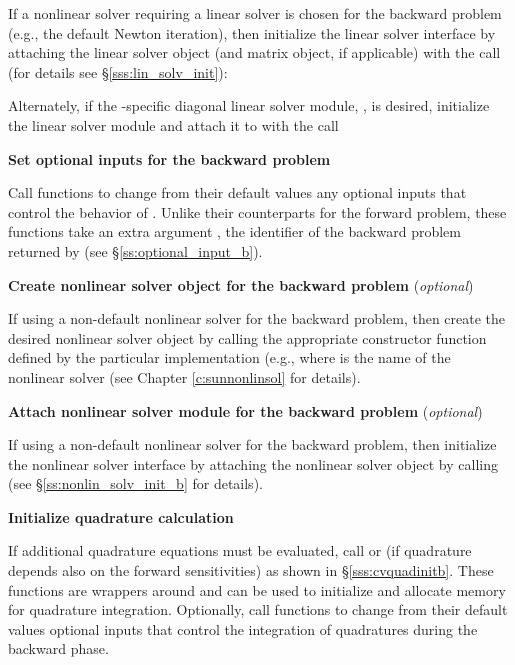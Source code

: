 \begin{Steps}
  If a nonlinear solver requiring a linear solver is chosen for the backward
  problem (e.g., the default Newton iteration), then initialize the
  {\cvls} linear solver interface by attaching the linear solver
  object (and matrix object, if applicable) with the call (for details see
  \S\ref{sss:lin_solv_init}):


  Alternately, if the {\cvodes}-specific diagonal linear solver module,
  {\cvdiag}, is desired, initialize the linear solver module and
  attach it to {\cvodes} with the call


\item
  {\bf Set optional inputs for the backward problem}

  Call  functions to change from their default values
  any optional inputs that control the behavior of {\cvodes}. Unlike
  their counterparts for the forward problem, these functions take an
  extra argument , the identifier of the backward problem returned
  by  (see \S\ref{ss:optional_input_b}).

\item
  {\bf Create nonlinear solver object for the backward problem} (\textit{optional})

  If using a non-default nonlinear solver for the backward problem, then create
  the desired nonlinear solver object by calling the appropriate constructor
  function defined by the particular {\sunnonlinsol} implementation (e.g.,
   where \id{***} is the name of the
  nonlinear solver (see Chapter \ref{c:sunnonlinsol} for details).

\item
  {\bf Attach nonlinear solver module for the backward problem} (\textit{optional})

  If using a non-default nonlinear solver for the backward problem, then
  initialize the nonlinear solver interface by attaching the nonlinear solver
  object by calling \\ \noindent
  (see \S\ref{ss:nonlin_solv_init_b} for details).

\item \label{i:quadB}
  {\bf Initialize quadrature calculation}

  If additional quadrature equations must be evaluated,
  call  or  (if quadrature depends also on the
  forward sensitivities) as shown in \S\ref{sss:cvquadinitb}. These functions are
  wrappers around  and can be used to initialize and allocate
  memory for quadrature integration. Optionally, call  functions
  to change from their default values optional inputs that control the integration
  of quadratures during the backward phase.


\end{Steps}
